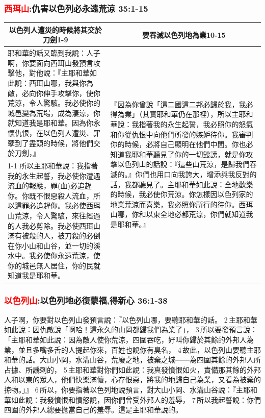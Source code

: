 \subsubsection{\textcolor{red}{西珥山}:仇害以色列必永遠荒涼 35:1-15}
\begin{table}[H]
\centering
\begin{tabular}{p{9.5cm}|p{7.75cm}}\hline\hline
\multicolumn{1}{c|}{以色列人遭災的時候將其交於刀劍1-9}&\multicolumn{1}{c}{要吞滅以色列地為業10-15}\\\hline
耶和華的話又臨到我說：人子啊，你要面向西珥山發預言攻擊他，對他說：『主耶和華如此說：西珥山哪，我與你為敵，必向你伸手攻擊你，使你荒涼，令人驚駭。我必使你的城邑變為荒場，成為淒涼，你就知道我是耶和華。因為你永懷仇恨，在以色列人遭災、罪孽到了盡頭的時候，將他們交於刀劍，』 
&\multirow{2}{8.cm}{『因為你曾說「這二國這二邦必歸於我，我必得為業」（其實耶和華仍在那裡），所以主耶和華說：我指著我的永生起誓，我必照你的怒氣和你從仇恨中向他們所發的嫉妒待你。我審判你的時候，必將自己顯明在他們中間。你也必知道我耶和華聽見了你的一切毀謗，就是你攻擊以色列山的話說：『這些山荒涼，是歸我們吞滅的。』你們也用口向我誇大，增添與我反對的話，我都聽見了。主耶和華如此說：全地歡樂的時候，我必使你荒涼。你怎樣因以色列家的地業荒涼而喜樂，我必照你所行的待你。西珥山哪，你和以東全地必都荒涼，你們就知道我是耶和華。』}\\\cline{1-1}
所以主耶和華說：我指著我的永生起誓，我必使你遭遇流血的報應，罪(血)必追趕你。你既不恨惡殺人流血，所以這罪必追趕你。我必使西珥山荒涼，令人驚駭，來往經過的人我必剪除。我必使西珥山滿有被殺的人，被刀殺的必倒在你小山和山谷，並一切的溪水中。我必使你永遠荒涼，使你的城邑無人居住，你的民就知道我是耶和華。&\\\hline
\end{tabular}
\end{table}


\subsubsection{\textcolor{red}{以色列山}:以色列地必復蒙福,得新心 36:1-38}
人子啊，你要對以色列山發預言說：『以色列山哪，要聽耶和華的話。 2 主耶和華如此說：因仇敵說「啊哈！這永久的山岡都歸我們為業了」， 3 所以要發預言說：「主耶和華如此說：因為敵人使你荒涼，四圍吞吃，好叫你歸於其餘的外邦人為業，並且多嘴多舌的人提起你來，百姓也說你有臭名， 4 故此，以色列山要聽主耶和華的話。大山小岡，水溝山谷，荒廢之地，被棄之城——為四圍其餘的外邦人所占據、所譏刺的， 5 主耶和華對你們如此說：我真發憤恨如火，責備那其餘的外邦人和以東的眾人，他們快樂滿懷，心存恨惡，將我的地歸自己為業，又看為被棄的掠物。」』 6 所以，你要指著以色列地說預言，對大山小岡、水溝山谷說：『主耶和華如此說：我發憤恨和憤怒說，因你們曾受外邦人的羞辱， 7 所以我起誓說：你們四圍的外邦人總要擔當自己的羞辱。這是主耶和華說的。


